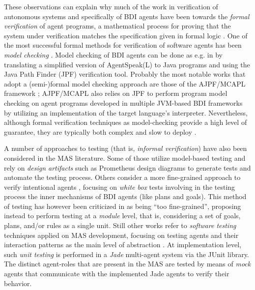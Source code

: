 These observations can explain why much of the work in verification of autonomous systems and specifically of BDI agents have been towards the \textit{formal verification} of agent programs, a mathematical process for proving that the system under verification matches the specification given in formal logic \cite{Bordini2004}. One of the most successful formal methods for verification of software agents has been \textit{model checking} \cite{Clarke2000}. Model checking of BDI agents can be done as e.g. in \cite{Bordini2006_Veify} by translating a simplified version of AgentSpeak(L) to Java programs and using the Java Path Finder (JPF) verification tool. Probably the most notable works that adopt a (semi-)formal model checking approach are those of the AJPF/MCAPL framework \cite{Dennis2016,Ferrando2019};
AJPF/MCAPL also relies on JPF to perform program model checking on agent programs developed in multiple JVM-based BDI frameworks by utilizing an implementation of the target language's interpreter. 
Nevertheless, although formal verification techniques as model-checking provide a high level of guarantee, they are typically both complex and slow to deploy \cite{Winikoff2019}. 

A number of approaches to testing (that is, \textit{informal verification})  have also been considered in the MAS literature. Some of those utilize model-based testing \cite{Poutakidis2009,Zhang2007} and rely on \textit{design artifacts} such as Prometheus design diagrams \cite{padgham2005developing} to generate tests and automate the testing process. Others consider a more fine-grained approach to verify intentional agents \cite{Ekinci2009,Padgham2013}, focusing on \textit{white box} tests involving in the testing process the inner mechanisms of BDI agents (like plans and goals). This method of testing has however been criticized in \cite{Koeman2016} as being ``too fine-grained'', proposing instead to perform testing at a \textit{module} level, that is, considering a set of goals, plans, and/or rules as a single unit. Still other works refer to \textit{software testing} techniques applied on MAS development, focusing on testing agents and their interaction patterns as the main level of abstraction \cite{Coelho2007,Khamis2013}. At implementation level, such \textit{unit testing} is performed in a \textit{Jade} multi-agent system via the JUnit library. %
The distinct agent-roles 
that are present in the MAS are tested by means of \textit{mock} agents that communicate with the implemented Jade agents to verify their behavior. 
